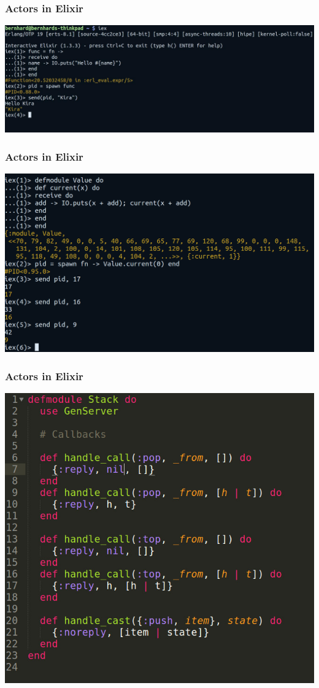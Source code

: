 \documentclass{beamer}
\begin{document}

\begin{frame}
\frametitle{Actors in Elixir}
\includegraphics[width=1.2\linewidth]{./elixir_hello_kira.jpg}
\end{frame}


\begin{frame}
\frametitle{Actors in Elixir}
\includegraphics[width=1.15\linewidth]{./elixir_state.png}
\end{frame}


\begin{frame}
\frametitle{Actors in Elixir}
\includegraphics[width=0.6\linewidth]{./GenServerCode.jpg}
\end{frame}
\end{document}
